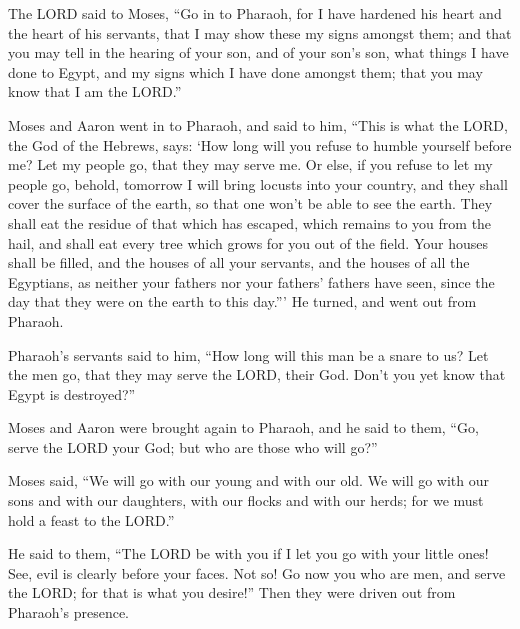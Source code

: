  The LORD said to Moses, ``Go in to Pharaoh, for I have
hardened his heart and the heart of his servants, that I may show these
my signs amongst them;  and that you may tell in the hearing
of your son, and of your son's son, what things I have done to Egypt,
and my signs which I have done amongst them; that you may know that I am
the LORD.''

 Moses and Aaron went in to Pharaoh, and said to him, ``This
is what the LORD, the God of the Hebrews, says: `How long will you
refuse to humble yourself before me? Let my people go, that they may
serve me.  Or else, if you refuse to let my people go,
behold, tomorrow I will bring locusts into your country, 
and they shall cover the surface of the earth, so that one won't be able
to see the earth. They shall eat the residue of that which has escaped,
which remains to you from the hail, and shall eat every tree which grows
for you out of the field.  Your houses shall be filled, and
the houses of all your servants, and the houses of all the Egyptians, as
neither your fathers nor your fathers' fathers have seen, since the day
that they were on the earth to this day.''' He turned, and went out from
Pharaoh.

 Pharaoh's servants said to him, ``How long will this man be
a snare to us? Let the men go, that they may serve the LORD, their God.
Don't you yet know that Egypt is destroyed?''

 Moses and Aaron were brought again to Pharaoh, and he said
to them, ``Go, serve the LORD your God; but who are those who will go?''

 Moses said, ``We will go with our young and with our old.
We will go with our sons and with our daughters, with our flocks and
with our herds; for we must hold a feast to the LORD.''

 He said to them, ``The LORD be with you if I let you go
with your little ones! See, evil is clearly before your faces.
 Not so! Go now you who are men, and serve the LORD; for
that is what you desire!'' Then they were driven out from Pharaoh's
presence.

